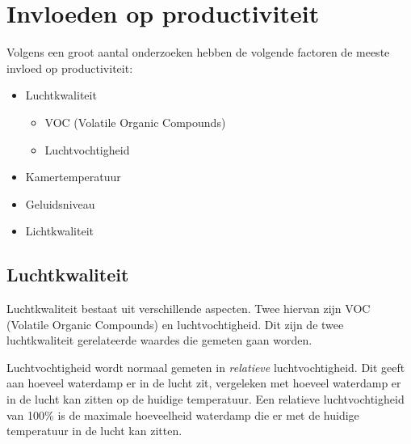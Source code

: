 
\section{Invloeden op productiviteit} \label{sec:theory}
Volgens een groot aantal onderzoeken hebben de volgende factoren de meeste invloed op productiviteit\cite{comfort-grootheden}:
\begin{itemize}
    \item Luchtkwaliteit
    \begin{itemize}
        \item VOC (Volatile Organic Compounds)
        \item Luchtvochtigheid
    \end{itemize}
    \item Kamertemperatuur
    \item Geluidsniveau
    \item Lichtkwaliteit
\end{itemize}


\subsection{Luchtkwaliteit}
Luchtkwaliteit bestaat uit verschillende aspecten. Twee hiervan zijn VOC (Volatile Organic Compounds) en luchtvochtigheid\cite{comfort-grootheden}\cite{luchtkwal-is-voc-denk-ik-misschien}. Dit zijn de twee luchtkwaliteit gerelateerde waardes die gemeten gaan worden.

Luchtvochtigheid wordt normaal gemeten in \textit{relatieve} luchtvochtigheid. Dit geeft aan hoeveel waterdamp er in de lucht zit, vergeleken met hoeveel waterdamp er in de lucht kan zitten op de huidige temperatuur. Een relatieve luchtvochtigheid van 100\% is de maximale hoeveelheid waterdamp die er met de huidige temperatuur in de lucht kan zitten. 


